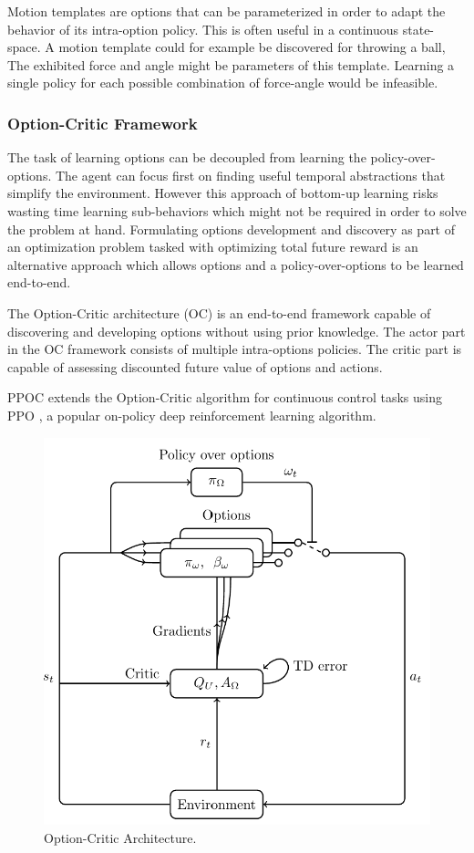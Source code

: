 Motion templates \cite{motion_templates} are options that can be parameterized in order to adapt the behavior of its intra-option policy.
This is often useful in a continuous state-space. A motion template could for example be discovered for throwing a ball, The exhibited
force and angle might be parameters of this template. Learning a single policy for each possible combination of force-angle would be infeasible.

\subsubsection{Option-Critic Framework}

The task of learning options can be decoupled from learning the policy-over-options. The agent can focus first on finding useful temporal
abstractions that simplify the environment. However this approach of bottom-up learning risks wasting time learning sub-behaviors which might not be required
in order to solve the problem at hand. Formulating options development and discovery as part of an optimization problem tasked with optimizing
total future reward is an alternative approach which allows options and a policy-over-options to be learned end-to-end.

The Option-Critic architecture (OC) \cite{option-critic} is an end-to-end framework capable of discovering and developing options without
using prior knowledge. The actor part in the OC framework consists of multiple intra-options policies. The critic part is capable of assessing discounted
future value of options and actions.

PPOC \cite{PPOC} extends the Option-Critic algorithm for continuous control tasks using PPO \cite{PPO}, a popular on-policy deep reinforcement learning algorithm.

\begin{figure}[H]
    \centering
    \label{fig:options_critic}
    \caption{Option-Critic Architecture.}
    \includegraphics[scale=0.2]{Images/option-critic.png}
\end{figure}

